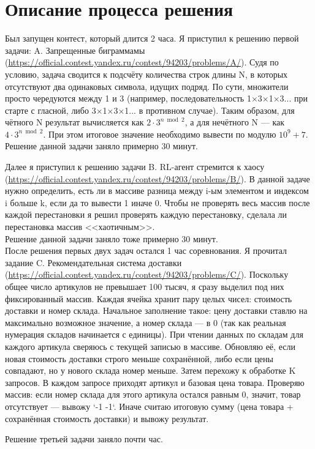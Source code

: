 \documentclass[oneside,a4paper,14pt]{extarticle} %
\begin{document}
	\section*{Описание процесса решения}
	Был запущен контест, который длится 2 часа.
	Я приступил к решению первой задачи: A. Запрещенные биграммамы
	(\url{https://official.contest.yandex.ru/contest/94203/problems/A/}).
	Судя по условию, задача сводится к подсчёту количества строк длины N, в которых отсутствуют два одинаковых 
	символа, идущих подряд. По сути, множители просто чередуются между 1 и 3 (например, последовательность 1×3×1×3... 
	при старте с гласной, либо 3×1×3×1... в противном случае).
	Таким образом, для чётного N результат вычисляется как $2 \cdot 3^{n \bmod 2}$, а для нечётного 
	N — как $4 \cdot 3^{n \bmod 2}$. При этом итоговое значение необходимо вывести по модулю $10^9 + 7$. \\
	
	
	Решение данной задачи заняло примерно 30 минут.
	
	\newpage
	
	Далее я приступил к решению задачи B. RL-агент стремится к хаосу
	(\url{https://official.contest.yandex.ru/contest/94203/problems/B/}). 
	В данной задаче нужно определить, есть ли в массиве разница между i-ым элементом и индексом i
	больше k, если да то вывести 1 иначе 0. Чтобы не проверять весь массив после каждой  перестановки
	я решил проверять каждую перестановку, сделала ли перестановка массив <<хаотичным>>. \\
	
	
	Решение данной задачи заняло тоже примерно 30 минут. \\
	
	После решения первых двух задач остался 1 час соревнования. Я прочитал задание
	C. Рекомендательная система доставки
	(\url{https://official.contest.yandex.ru/contest/94203/problems/C/}).
	Поскольку общее число артикулов не превышает 100 тысяч, я сразу выделил под них фиксированный массив. 
	Каждая ячейка хранит пару целых чисел: стоимость доставки и номер склада.
	Начальное заполнение такое: цену доставки ставлю на максимально возможное значение, а номер склада — в 0 
	(так как реальная нумерация складов начинается с единицы).
	При чтении данных по складам для каждого артикула сверяюсь с текущей записью в массиве. Обновляю её, если 
	новая стоимость доставки строго меньше сохранённой, либо если цены совпадают, но у нового склада номер меньше.
	Затем перехожу к обработке K запросов. В каждом запросе приходят артикул и базовая цена товара. Проверяю массив: 
	если номер склада для этого артикула остался равным 0, значит, товар отсутствует — вывожу `-1 -1`. 
	Иначе считаю итоговую сумму (цена товара + сохранённая стоимость доставки) и вывожу результат. 
	\newpage
	
	Решение третьей задачи заняло почти час. \\
	
\end{document}

